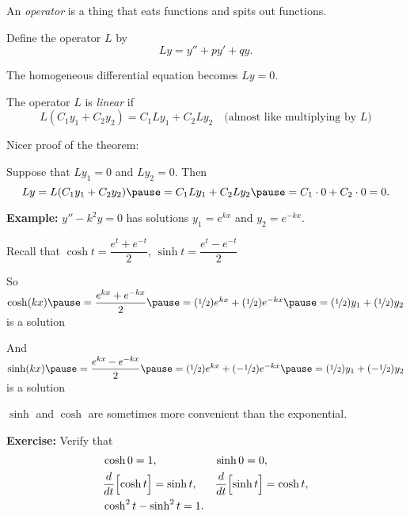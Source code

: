 \documentclass[10pt,aspectratio=169]{beamer}
\begin{document}
\begin{frame}

An \emph{operator} is a thing that eats functions and spits out functions.

\medskip
\pause

Define the operator $L$ by
\[
Ly = y'' + py' + qy .
\]

\medskip
\pause

The homogeneous differential equation becomes $Ly=0$.

\medskip
\pause

The operator $L$ is \emph{linear} if 
\[
L(C_1y_1 + C_2y_2) = 
C_1 Ly_1 + C_2 Ly_2
\quad \text{(almost like multiplying by $L$)}
\] 

\medskip
\pause

Nicer proof of the theorem:

\medskip
\pause

Suppose that $Ly_1 =0$ and $Ly_2=0$.
\pause
Then
\[
Ly = L(C_1y_1 + C_2y_2) \pause = 
C_1 Ly_1 + C_2 Ly_2 \pause = C_1 \cdot 0 + C_2 \cdot 0 = 0 .
\]

\end{frame}

\begin{frame}
\textbf{Example:}
$y'' - k^2y = 0$ has solutions
$y_1 = e^{kx}$ and 
$y_2 = e^{-kx}$.

\medskip
\pause

Recall that 
\quad
$\cosh t = \dfrac{e^{t}  + e^{-t}}{2}$,
\quad
$\sinh t = \dfrac{e^{t}  - e^{-t}}{2}$

\medskip
\pause

So
\quad
$\cosh(kx)
\pause = \dfrac{e^{kx}  + e^{-kx}}{2}
\pause = (\nicefrac{1}{2}) e^{kx}  + (\nicefrac{1}{2}) e^{-kx}
\pause = (\nicefrac{1}{2}) y_1  + (\nicefrac{1}{2}) y_2$
\quad
is a solution

\medskip
\pause

And
\quad
$\sinh(kx)
\pause = \dfrac{e^{kx}  - e^{-kx}}{2}
\pause = (\nicefrac{1}{2}) e^{kx}  + (-\nicefrac{1}{2}) e^{-kx}
\pause = (\nicefrac{1}{2}) y_1  + (-\nicefrac{1}{2}) y_2$
\quad
is a solution

\medskip
\pause

$\sinh$ and $\cosh$ are sometimes more convenient than the
exponential.

\medskip
\pause

\textbf{Exercise:} Verify that
\begin{align*}
& \cosh 0  = 1 , &   & \sinh 0 = 0 , \\
& \frac{d}{dt} \Bigl[ \cosh t \Bigr] = \sinh t , &  & \frac{d}{dt} \Bigl[ \sinh t \Bigr] = \cosh t , \\
& \cosh^2 t - \sinh^2 t = 1 .
\end{align*}

\end{frame}
\end{document}
